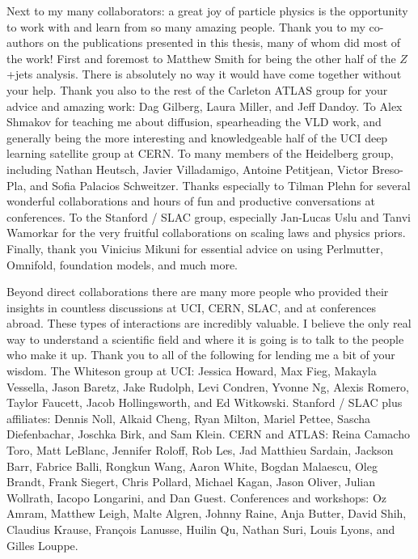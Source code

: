 {  Next to my many collaborators: a great joy of particle physics is the opportunity to work with and learn from so many amazing people.
  Thank you to my co-authors on the publications presented in this thesis, many of whom did most of the work!
  First and foremost to Matthew Smith for being the other half of the $Z$+jets analysis.
  There is absolutely no way it would have come together without your help.
  Thank you also to the rest of the Carleton ATLAS group for your advice and amazing work: Dag Gilberg, Laura Miller, and Jeff Dandoy.
  To Alex Shmakov for teaching me about diffusion, spearheading the VLD work, and generally being the more interesting and knowledgeable half of the UCI deep learning satellite group at CERN.
  To many members of the Heidelberg group, including Nathan Heutsch, Javier Villadamigo, Antoine Petitjean, Victor Breso-Pla, and Sofia Palacios Schweitzer.
  Thanks especially to Tilman Plehn for several wonderful collaborations and hours of fun and productive conversations at conferences.
  To the Stanford / SLAC group, especially Jan-Lucas Uslu and Tanvi Wamorkar for the very fruitful collaborations on scaling laws and physics priors.
  Finally, thank you Vinicius Mikuni for essential advice on using Perlmutter, Omnifold, foundation models, and much more.

  Beyond direct collaborations there are many more people who provided their insights in countless discussions at UCI, CERN, SLAC, and at conferences abroad.
  These types of interactions are incredibly valuable.
  I believe the only real way to understand a scientific field and where it is going is to talk to the people who make it up.
  Thank you to all of the following for lending me a bit of your wisdom.
  The Whiteson group at UCI: Jessica Howard, Max Fieg, Makayla Vessella, Jason Baretz, Jake Rudolph, Levi Condren, Yvonne Ng, Alexis Romero, Taylor Faucett, Jacob Hollingsworth, and Ed Witkowski.
  Stanford / SLAC plus affiliates: Dennis Noll, Alkaid Cheng, Ryan Milton, Mariel Pettee, Sascha Diefenbachar, Joschka Birk, and Sam Klein.
  CERN and ATLAS: Reina Camacho Toro, Matt LeBlanc, Jennifer Roloff, Rob Les, Jad Matthieu Sardain, Jackson Barr, Fabrice Balli, Rongkun Wang, Aaron White, Bogdan Malaescu, Oleg Brandt, Frank Siegert, Chris Pollard, Michael Kagan, Jason Oliver, Julian Wollrath, Iacopo Longarini, and Dan Guest.
  Conferences and workshops: Oz Amram, Matthew Leigh, Malte Algren, Johnny Raine, Anja Butter, David Shih, Claudius Krause, François Lanusse, Huilin Qu, Nathan Suri, Louis Lyons, and Gilles Louppe.

}
